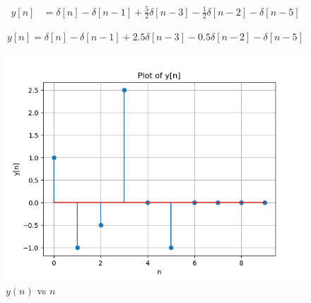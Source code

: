 \documentclass[journal,12pt,twocolumn]{IEEEtran}
\theoremstyle{remark}
\begin{document}
\begin{align}
 y[n] &= \delta[n] - \delta[n-1] + \frac{5}{2}\delta[n-3] - \frac{1}{2}\delta[n-2] - \delta[n-5]
\end{align}

\begin{align}
y[n] = \delta[n] - \delta[n-1] + 2.5\delta[n-3] - 0.5\delta[n-2] - \delta[n-5] 
\end{align}

\begin{figure}[!h]
    \centering
    \includegraphics[width = \columnwidth]{figs/plotsss.png}
    \caption{$y(n)$ vs $n$}
    \label{fig:swag_plot}
\end{figure}
\end{document}

